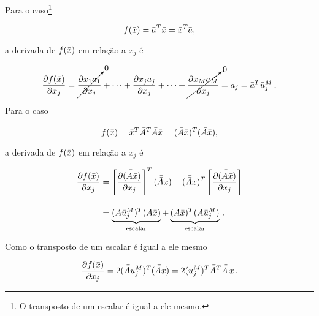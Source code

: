 \begin{example}
    Para o caso\footnote{O transposto de um escalar é igual a ele mesmo.}

    \begin{equation}
    f(\bar{x}) = \bar{a}^T\bar{x} = \bar{x}^T\bar{a},
    \end{equation}
    
    \noindent a derivada de $f(\bar{x})$ em relação
    a $x_j$ é
    
    \begin{equation}
    \dfrac{\partial f(\bar{x})}{\partial x_j} =
        \cancelto{0}{\dfrac{\partial x_1a_1}{\partial x_j}} + \dotsb +
        \dfrac{\partial x_ja_j}{\partial x_j} + \dotsb +
        \cancelto{0}{\dfrac{\partial x_M a_M}{\partial x_j}}
        = a_j = \bar{a}^T \bar{u}_j^M
    \thinspace .
    \label{eq:deriv_aTx}
    \end{equation}
\end{example}

\begin{example}
    Para o caso

    \begin{equation}
    f(\bar{x}) = \bar{x}^T\bar{\bar{A}}^T\bar{\bar{A}}\bar{x} =
        (\bar{\bar{A}}\bar{x})^T(\bar{\bar{A}}\bar{x}),
    \end{equation}
    
    \noindent a derivada de $f(\bar{x})$ em relação
    a $x_j$ é
    
    \begin{equation}
    \begin{split}
    \dfrac{\partial f(\bar{x})}{\partial x_j} &=
        \left[\dfrac{\partial(\bar{\bar{A}}\bar{x})}{\partial x_j}\right]^T(\bar{\bar{A}}\bar{x}) +
        (\bar{\bar{A}}\bar{x})^T\left[\dfrac{\partial(\bar{\bar{A}}\bar{x})}{\partial x_j}\right]
    \\[0.3cm]
    &=
    \underbrace{(\bar{\bar{A}}\bar{u}_j^M)^T(\bar{\bar{A}}\bar{x})}_{\text{escalar}} + 
    \underbrace{(\bar{\bar{A}}\bar{x})^T(\bar{\bar{A}}\bar{u}_j^M)}_{\text{escalar}}
    \thinspace .
    \end{split}
    \end{equation}

    \noindent Como o transposto de um escalar é igual a ele mesmo

    \begin{equation}
    \dfrac{\partial f(\bar{x})}{\partial x_j} =
        2(\bar{\bar{A}}\bar{u}_j^M)^T(\bar{\bar{A}}\bar{x}) =
        2(\bar{u}_j^M)^T \bar{\bar{A}}^T\bar{\bar{A}}\thinspace\bar{x}
    \thinspace .
    \end{equation}    
\end{example}



